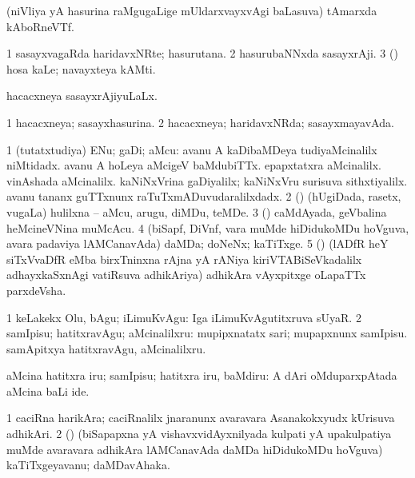{{\bentry
{} 
\gl{\nA}
\expl{}
\bmng
 (niVliya yA hasurina raMgugaLige mUldarxvayxvAgi baLasuva) tAmarxda kAboRneVTf. 
\emng
\eentry

\bentry
{} 
\gl{\nA}
\expl{}
\bmng
\bnum
\num{1} sasayxvagaRda haridavxNRte; hasurutana. 
\num{2} hasurubaNNxda sasayxrAji. 
\num{3} (\kAparx) hosa kaLe; navayxteya kAMti. 
\enum
\emng
\eentry

\bentry
{} 
\gl{\gu}
\expl{}
\bmng
 hacacxneya sasayxrAjiyuLaLx. 
\emng
\eentry

\bentry
{} 
\gl{\gu}
\expl{}
\bmng
\bnum
\num{1} hacacxneya; sasayxhasurina. 
\num{2} hacacxneya; haridavxNRda; sasayxmayavAda. 
\enum
\emng
\eentry

\bentry
{} 
\gl{\nA}
\expl{}
\bmng
\bnum
\num{1} (tutatxtudiya) ENu; gaDi; aMcu:  avanu A kaDibaMDeya tudiyaMcinalilx niMtidadx.  avanu A hoLeya aMcigeV baMdubiTTx.  epapxtatxra aMcinalilx.  vinAshada aMcinalilx.  kaNiNxVrina gaDiyalilx; kaNiNxVru surisuva sithxtiyalilx.  avanu tananx guTTxnunx raTuTxmADuvudaralilxdadx. 
\num{2} (\birx) (hUgiDada, rasetx, \mo vugaLa) hulilxna -- aMcu, arugu, diMDu, teMDe. 
\num{3} (\vAshi) caMdAyada, geVbalina heMcineVNina muMcAcu. 
\num{4} (biSapf, DiVnf, \mo vara muMde hiDidukoMDu hoVguva, avara padaviya lAMCanavAda) daMDa; doNeNx; kaTiTxge. 
\num{5} (\ca) (lADfR heY siTxVvaDfR eMba birxTninxna rAjna yA rANiya kiriVTABiSeVkadalilx adhayxkaSxnAgi vatiRsuva adhikAriya) adhikAra vAyxpitxge oLapaTTx parxdeVsha. 
\enum
\emng
\eentry

\bentry
{} 
\gl{\akirx}
\expl{}
\bmng
\bnum
\num{1} keLakekx Olu, bAgu; iLimuKvAgu:  Iga iLimuKvAgutitxruva sUyaR. 
\num{2} samIpisu; hatitxravAgu; aMcinalilxru:  mupipxnatatx sari; mupapxnunx samIpisu.  samApitxya hatitxravAgu, aMcinalilxru. 
\enum
\emng

\noindent 
\gl{\pagu}
\expl{}
 aMcina hatitxra iru; samIpisu; hatitxra iru, baMdiru:  A dAri oMduparxpAtada aMcina baLi ide. \eentry

\bentry
{} 
\gl{\nA}
\bmng
\bnum
\num{1} caciRna harikAra; caciRnalilx jnaranunx avaravara Asanakokxyudx kUrisuva adhikAri. 
\num{2} (\birx) (biSapapxna yA vishavxvidAyxnilyada kulpati yA upakulpatiya muMde avaravara adhikAra lAMCanavAda daMDa hiDidukoMDu hoVguva) kaTiTxgeyavanu; daMDavAhaka. 
\enum
\emng
\eentry

}}
